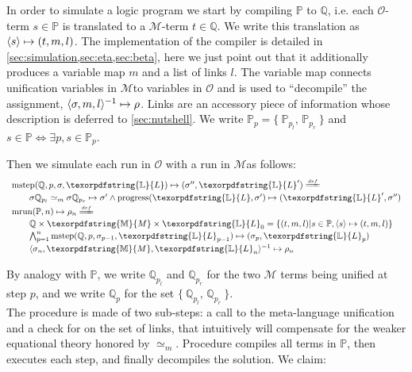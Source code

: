 \documentclass[sigconf,natbib=false,review]{acmart}
\newcommand{\UnifRel}{\ensuremath{\simeq}}
\newcommand{\Ue}{\ensuremath{\UnifRel_m}\xspace}
\newcommand{\Fo}{\texorpdfstring{\ensuremath{\mathcal{O}\xspace}}{O}} %
\newcommand{\Ho}{\texorpdfstring{\ensuremath{\mathcal{M}}\xspace}{M}}
\newcommand{\linkStore}{\texorpdfstring{\ensuremath{\mathbb{L}}\xspace}{L}}
\newcommand{\mapStore}{\texorpdfstring{\ensuremath{\mathbb{M}}\xspace}{M}}
\newcommand{\foUnifPb}{\ensuremath{\mathbb{P}}\xspace}
\newcommand{\hoUnifPb}{\ensuremath{\mathbb{Q}}\xspace}
\begin{document}
\noindent
In order to simulate a logic program we start by compiling
\foUnifPb to \hoUnifPb, i.e.
each \Fo{}-term $s \in \foUnifPb$ is translated to a \Ho{}-term $t \in \hoUnifPb$.
We write this translation as $\langle s \rangle\mapsto(t,m,l)$. The implementation of the compiler
is detailed in \cref{sec:simulation,sec:eta,sec:beta}, here we just point
out that it additionally produces a variable map $m$ and a list of links $l$.
The variable map connects unification variables in \Ho to variables
in \Fo{} and is used to ``decompile'' the assignment,
$\langle \sigma,m,l \rangle^{-1}\mapsto \rho$. Links are an accessory piece of information whose
description is deferred to \cref{sec:nutshell}.
We write $\foUnifPb_p = \{~ \foUnifPb_{p_l},\, \foUnifPb_{p_r} ~\}$
and $s \in \foUnifPb \Leftrightarrow \exists p, s \in \foUnifPb_p$.

Then we simulate each run in \Fo{} with a run in \Ho as follows:
%
$$
\begin{array}{l}
\stepH{\hoUnifPb}{p}{\sigma}{\linkStore}{\sigma''}{\linkStore'} \deff\vspace{2pt}\\
  \qquad\stepHD{\hoUnifPb}{p}{\sigma}{\sigma'}{\sigma''}{\linkStore}\vspace{2pt}\\
  \runH{\foUnifPb}{n}{\rho} \deff \vspace{2pt}\\
  \qquad \hoUnifPb \times \mapStore \times \linkStore_0 = \{ (t,m,l) | s \in \foUnifPb, \C{s}{t}{m}{l} \}\vspace{2pt}\\
  \qquad \runHD{\hoUnifPb}{n}{\linkStore}\vspace{2pt}\\
  \qquad \D{\sigma_{n}}{\mapStore}{\linkStore_{n}}{\rho_{n}}
\end{array}
$$

\noindent
By analogy with \foUnifPb, we write $\hoUnifPb_{p_l}$ and $\hoUnifPb_{p_r}$
for the two \Ho{} terms being unified at step $p$, and we write $\hoUnifPb_p$
for the set $\{~ \hoUnifPb_{p_l},\, \hoUnifPb_{p_r} ~\}$.\\
The \hstep{} procedure is made of two sub-steps: a call to the meta-language
unification and a check for \progress{} on the set of links, that intuitively
will compensate for the weaker equational theory honored by \Ue.
Procedure \hrun{} compiles all terms in \foUnifPb{}, then executes each step, and
finally decompiles the solution.
We claim:
\end{document}
